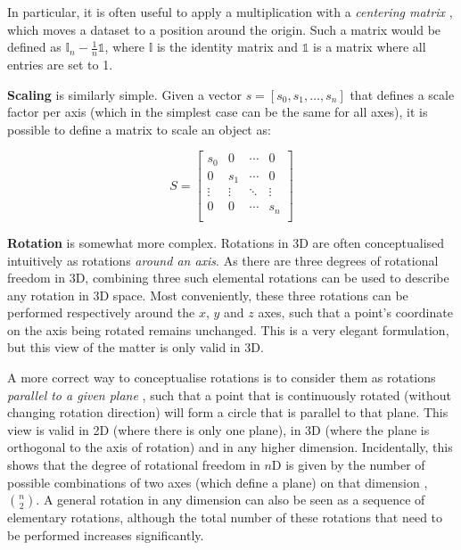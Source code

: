 In particular, it is often useful to apply a multiplication with a \emph{centering matrix} \citep[\S{}3.2]{Marden96}, which  moves a dataset to a position around the origin.
Such a matrix would be defined as $\mathbb{I}_n - \frac{1}{n}\mathbb{1}$, where $\mathbb{I}$ is the identity matrix and $\mathbb{1}$ is a matrix where all entries are set to 1.

\textbf{Scaling} is similarly simple.
Given a vector $s = \left[ s_0, s_1, \ldots, s_n \right]$ that defines a scale factor per axis (which in the simplest case can be the same for all axes), it is possible to define a matrix to scale an object as:

\begin{equation*}
S = \begin{bmatrix}
s_0 & 0 & \cdots & 0 \\
0 & s_1 & \cdots & 0 \\
\vdots & \vdots & \ddots & \vdots \\
0 & 0 & \cdots & s_n \\
\end{bmatrix}
\end{equation*}

\textbf{Rotation} is somewhat more complex.
Rotations in 3D are often conceptualised intuitively as rotations \emph{around an axis}.
As there are three degrees of rotational freedom in 3D, combining three such elemental rotations can be used to describe any rotation in 3D space.
Most conveniently, these three rotations can be performed respectively around the $x$, $y$ and $z$ axes, such that a point's coordinate on the axis being rotated remains unchanged.
This is a very elegant formulation, but this view of the matter is only valid in 3D.

A more correct way to conceptualise rotations is to consider them as rotations \emph{parallel to a given plane} \citep{Hollasch91}, such that a point that is continuously rotated (without changing rotation direction) will form a circle that is parallel to that plane.
This view is valid in 2D (where there is only one plane), in 3D (where the plane is orthogonal to the axis of rotation) and in any higher dimension.
Incidentally, this shows that the degree of rotational freedom in $n$D is given by the number of possible combinations of two axes (which define a plane) on that dimension \citep{Hanson94}, \ie\ $\binom{n}{2}$.
A general rotation in any dimension can also be seen as a sequence of elementary rotations, although the total number of these rotations that need to be performed increases significantly.

